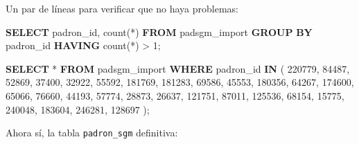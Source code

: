 \documentclass[spanish,]{article}
\newenvironment{Shaded}{}{}
\newcommand{\KeywordTok}[1]{\textcolor[rgb]{0.00,0.44,0.13}{\textbf{{#1}}}}
\newcommand{\DecValTok}[1]{\textcolor[rgb]{0.25,0.63,0.44}{{#1}}}
\newcommand{\FunctionTok}[1]{\textcolor[rgb]{0.02,0.16,0.49}{{#1}}}
\newcommand{\NormalTok}[1]{{#1}}
\begin{document}
Un par de líneas para verificar que no haya problemas:

\begin{Shaded}
\begin{Highlighting}[]
\KeywordTok{SELECT} \NormalTok{padron_id, }\FunctionTok{count}\NormalTok{(*) }
  \KeywordTok{FROM} \NormalTok{padsgm_import }
 \KeywordTok{GROUP} \KeywordTok{BY} \NormalTok{padron_id }\KeywordTok{HAVING} \FunctionTok{count}\NormalTok{(*) > }\DecValTok{1}\NormalTok{;}

\KeywordTok{SELECT} \NormalTok{* }\KeywordTok{FROM} \NormalTok{padsgm_import }\KeywordTok{WHERE} \NormalTok{padron_id }\KeywordTok{IN} \NormalTok{(}
 \DecValTok{220779}\NormalTok{, }\DecValTok{84487}\NormalTok{, }\DecValTok{52869}\NormalTok{, }\DecValTok{37400}\NormalTok{, }\DecValTok{32922}\NormalTok{, }\DecValTok{55592}\NormalTok{, }\DecValTok{181769}\NormalTok{,}
 \DecValTok{181283}\NormalTok{, }\DecValTok{69586}\NormalTok{, }\DecValTok{45553}\NormalTok{, }\DecValTok{180356}\NormalTok{, }\DecValTok{64267}\NormalTok{, }\DecValTok{174600}\NormalTok{, }\DecValTok{65066}\NormalTok{,}
 \DecValTok{76660}\NormalTok{, }\DecValTok{44193}\NormalTok{, }\DecValTok{57774}\NormalTok{, }\DecValTok{28873}\NormalTok{, }\DecValTok{26637}\NormalTok{, }\DecValTok{121751}\NormalTok{, }\DecValTok{87011}\NormalTok{,}
 \DecValTok{125536}\NormalTok{, }\DecValTok{68154}\NormalTok{, }\DecValTok{15775}\NormalTok{, }\DecValTok{240048}\NormalTok{, }\DecValTok{183604}\NormalTok{, }\DecValTok{246281}\NormalTok{, }\DecValTok{128697}
 \NormalTok{);}
\end{Highlighting}
\end{Shaded}

Ahora sí, la tabla \texttt{padron\_sgm} definitiva:
\end{document}
